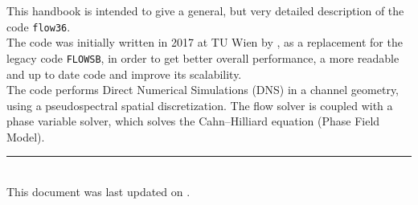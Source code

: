 This handbook is intended to give a general, but very detailed description of the code \texttt{flow36}.\\
The code was initially written in 2017 at TU Wien by \@author, as a replacement for the legacy code \texttt{FLOWSB}, in order to get better overall performance, a more readable and up to date code and improve its scalability.\\
The code performs Direct Numerical Simulations (DNS) in a channel geometry, using a pseudospectral spatial discretization. The flow solver is coupled with a phase variable solver, which solves the Cahn--Hilliard equation (Phase Field Model).


\vfill
\rule{14cm}{0.4pt}\\

This document was last updated on \@date.